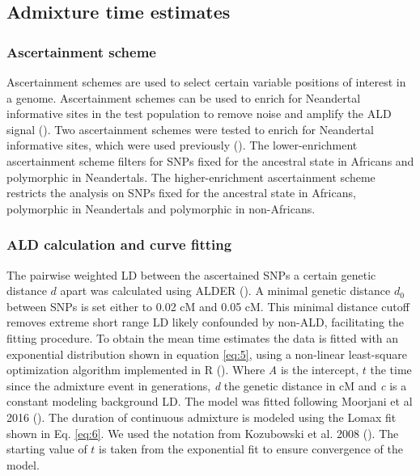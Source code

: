 \documentclass[]{article}
\begin{document}
\subsection{Admixture time estimates}\label{admixture time estimates}

\subsubsection{Ascertainment scheme}\label{asceteinment scheme}

Ascertainment schemes are used to select certain variable positions of
interest in a genome. Ascertainment schemes can be used to enrich for
Neandertal informative sites in the test population to remove noise and
amplify the ALD signal (\cite{sankararaman_date_2012}). Two
ascertainment schemes were tested to enrich for Neandertal informative
sites, which were used previously
(\cite{sankararaman_date_2012,fu_genome_2014}). The lower-enrichment
ascertainment scheme filters for SNPs fixed for the ancestral state in
Africans and polymorphic in Neandertals. The higher-enrichment
ascertainment scheme restricts the analysis on SNPs fixed for the
ancestral state in Africans, polymorphic in Neandertals and polymorphic
in non-Africans.

\subsubsection{ALD calculation and curve fitting}\label{ALD calculation and curve fitting}

The pairwise weighted LD between the ascertained SNPs a certain genetic
distance \(d\) apart was calculated using ALDER
(\cite{loh_inferring_2013}). A minimal genetic distance \(d_0\) between
SNPs is set either to 0.02 cM and 0.05 cM. This minimal distance cutoff
removes extreme short range LD likely confounded by non-ALD,
facilitating the fitting procedure. To obtain the mean time estimates
the data is fitted with an exponential distribution shown in equation
\ref{eq:5}, using a non-linear least-square optimization algorithm
implemented in R (\cite{R_Core_Team_2019}). Where \emph{A} is the
intercept, \(t\) the time since the admixture event in generations,
\emph{d} the genetic distance in cM and \emph{c} is a constant modeling
background LD. The model was fitted following Moorjani et al 2016
(\cite{moorjani_genetic_2016}). The duration of continuous admixture is
modeled using the Lomax fit shown in Eq. \ref{eq:6}. We used the
notation from Kozubowski et al. 2008 (\cite{Kozubowski_Testing_2008}).
The starting value of \(t\) is taken from the exponential fit to ensure
convergence of the model.
\end{document}
